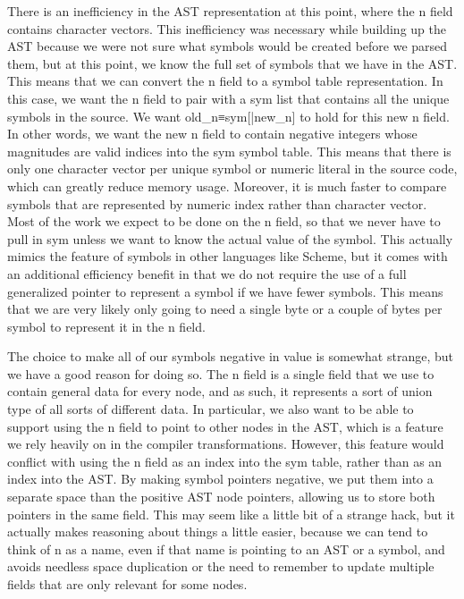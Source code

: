 \documentclass{article}%
\begin{document}
There is an inefficiency in the AST representation at this point,
where the {\Tt{}n\nwendquote} field contains character vectors.
This inefficiency was necessary while building up the AST because
we were not sure what symbols would be created
before we parsed them,
but at this point, we know the full set of symbols that we have in 
the AST.
This means that we can convert the {\Tt{}n\nwendquote} field to a symbol table 
representation.
In this case, we want the {\Tt{}n\nwendquote} field to pair with a {\Tt{}sym\nwendquote} list
that contains all the unique symbols in the source.
We want {\Tt{}old{\_}n≡sym[|new{\_}n]\nwendquote} to hold for this new {\Tt{}n\nwendquote} field.
In other words, we want the new {\Tt{}n\nwendquote} field to contain negative 
integers whose magnitudes are valid indices into the {\Tt{}sym\nwendquote} 
symbol table.
This means that there is only one character vector per unique symbol
or numeric literal in the source code, which can greatly reduce 
memory usage.
Moreover, it is much faster to compare symbols that are represented by 
numeric index rather than character vector.
Most of the work we expect to be done on the {\Tt{}n\nwendquote} field, so that we 
never have to pull in {\Tt{}sym\nwendquote} unless we want to know the actual value 
of the symbol.
This actually mimics the feature of symbols in other languages
like Scheme,
but it comes with an additional efficiency benefit in that we do not
require the use of a full generalized pointer to represent a symbol
if we have fewer symbols. 
This means that we are very likely only going to need a single byte 
or a couple of bytes per symbol to represent it in the {\Tt{}n\nwendquote} field.

The choice to make all of our symbols negative in value is somewhat 
strange, but we have a good reason for doing so.
The {\Tt{}n\nwendquote} field is a single field that we use to contain general 
data for every node, and as such, it represents a sort of union 
type of all sorts of different data.
In particular, we also want to be able to support using the {\Tt{}n\nwendquote} 
field to point to other nodes in the AST, which is a feature we 
rely heavily on in the compiler transformations.
However, this feature would conflict with using the {\Tt{}n\nwendquote} field as an 
index into the {\Tt{}sym\nwendquote} table, rather than as an index into the AST.
By making symbol pointers negative, we put them into a separate 
space than the positive AST node pointers, allowing us to store 
both pointers in the same field. This may seem like a little bit of 
a strange hack, but it actually makes reasoning about things a little 
easier, because we can tend to think of {\Tt{}n\nwendquote} as a name, even if that 
name is pointing to an AST or a symbol, and avoids needless space 
duplication or the need to remember to update multiple fields that are 
only relevant for some nodes.
\end{document}
